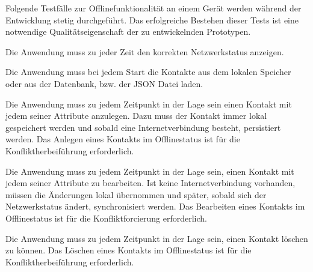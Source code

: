 Folgende Testfälle zur Offlinefunktionalität an einem Gerät werden während der Entwicklung stetig durchgeführt.
Das erfolgreiche Bestehen dieser Tests ist eine notwendige Qualitätseigenschaft der zu entwickelnden Prototypen.
\begin{description}[leftmargin=0.7cm,style=nextline]
\item[Netzwerkstatus:] 
Die Anwendung muss zu jeder Zeit den korrekten Netzwerkstatus anzeigen.\\
\item[Kontakte lesen:] 
Die Anwendung muss bei jedem Start die Kontakte aus dem lokalen Speicher oder aus der Datenbank, bzw. der \gls{JSON} Datei laden.\\
\item[Kontakt anlegen:] 
Die Anwendung muss zu jedem Zeitpunkt in der Lage sein einen Kontakt mit jedem seiner Attribute anzulegen.
Dazu muss der Kontakt immer lokal gespeichert werden und sobald eine Internetverbindung besteht, persistiert werden.
Das Anlegen eines Kontakts im Offlinestatus ist für die Konfliktherbeiführung erforderlich.\\
\item[Kontakt bearbeiten:] 
Die Anwendung muss zu jedem Zeitpunkt in der Lage sein, einen Kontakt mit jedem seiner Attribute zu bearbeiten.
Ist keine Internetverbindung vorhanden, müssen die Änderungen lokal übernommen und später, sobald sich der Netzwerkstatus ändert, synchronisiert werden.
Das Bearbeiten eines Kontakts im Offlinestatus ist für die Konfliktforcierung erforderlich.\\
\item[Kontakt löschen:] 
Die Anwendung muss zu jedem Zeitpunkt in der Lage sein, einen Kontakt löschen zu können.
Das Löschen eines Kontakts im Offlinestatus ist für die Konfliktherbeiführung erforderlich.
\end{description}